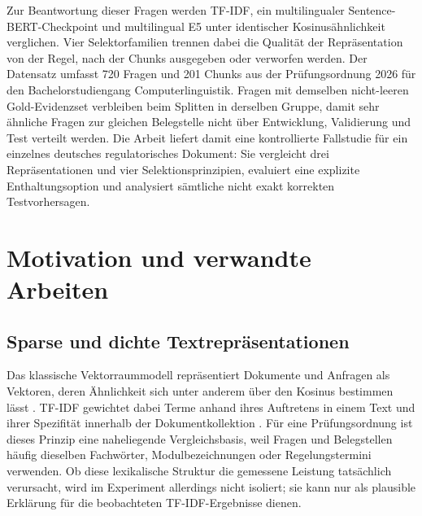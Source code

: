 \documentclass[11pt]{article}
\begin{document}
Zur Beantwortung dieser Fragen werden TF-IDF, ein multilingualer Sentence-BERT-Checkpoint und multilingual E5 unter identischer Kosinusähnlichkeit verglichen. Vier Selektorfamilien trennen dabei die Qualität der Repräsentation von der Regel, nach der Chunks ausgegeben oder verworfen werden. Der Datensatz umfasst 720 Fragen und 201 Chunks aus der Prüfungsordnung 2026 für den Bachelorstudiengang Computerlinguistik. Fragen mit demselben nicht-leeren Gold-Evidenzset verbleiben beim Splitten in derselben Gruppe, damit sehr ähnliche Fragen zur gleichen Belegstelle nicht über Entwicklung, Validierung und Test verteilt werden. Die Arbeit liefert damit eine kontrollierte Fallstudie für ein einzelnes deutsches regulatorisches Dokument: Sie vergleicht drei Repräsentationen und vier Selektionsprinzipien, evaluiert eine explizite Enthaltungsoption und analysiert sämtliche nicht exakt korrekten Testvorhersagen. 


\section{Motivation und verwandte Arbeiten}

\subsection{Sparse und dichte Textrepräsentationen}

Das klassische Vektorraummodell repräsentiert Dokumente und Anfragen als Vektoren, deren Ähnlichkeit sich unter anderem über den Kosinus bestimmen lässt \citep{salton1975vector}. TF-IDF gewichtet dabei Terme anhand ihres Auftretens in einem Text und ihrer Spezifität innerhalb der Dokumentkollektion \citep{sparckjones1972statistical}. Für eine Prüfungsordnung ist dieses Prinzip eine naheliegende Vergleichsbasis, weil Fragen und Belegstellen häufig dieselben Fachwörter, Modulbezeichnungen oder Regelungstermini verwenden. Ob diese lexikalische Struktur die gemessene Leistung tatsächlich verursacht, wird im Experiment allerdings nicht isoliert; sie kann nur als plausible Erklärung für die beobachteten TF-IDF-Ergebnisse dienen.
\end{document}
